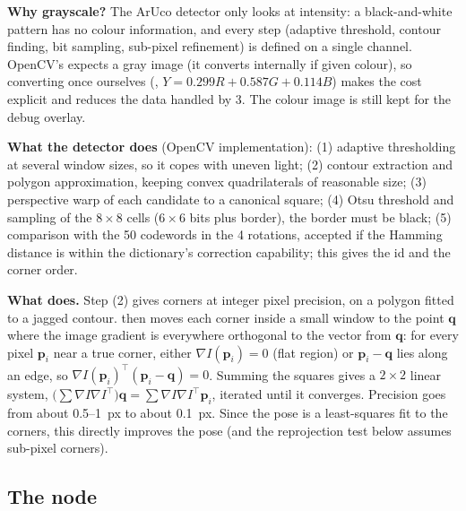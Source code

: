 \begin{keypoint}
\textbf{Why grayscale?} The ArUco detector only looks at intensity: a black-and-white pattern has no colour
information, and every step (adaptive threshold, contour finding, bit sampling, sub-pixel refinement) is defined on
a single channel. OpenCV's  expects a gray image (it converts internally if given colour), so
converting once ourselves (, $Y = 0.299R+0.587G+0.114B$) makes the cost
explicit and reduces the data handled by 3. The colour image is still kept for the debug overlay.

\textbf{What the detector does} (OpenCV implementation): (1) adaptive thresholding at several window sizes, so it
copes with uneven light; (2) contour extraction and polygon approximation, keeping convex quadrilaterals of
reasonable size; (3) perspective warp of each candidate to a canonical square; (4) Otsu threshold and sampling of the
$8\times8$ cells ($6\times6$ bits plus border), the border must be black; (5) comparison with the 50 codewords in the 4
rotations, accepted if the Hamming distance is within the dictionary's correction capability; this gives the id and
the corner order.

\textbf{What  does.} Step (2) gives corners at integer pixel precision, on a polygon fitted
to a jagged contour.  then moves each corner inside a small window to the point $\mathbf q$ where
the image gradient is everywhere orthogonal to the vector from $\mathbf q$: for every pixel $\mathbf p_i$ near a true
corner, either $\nabla I(\mathbf p_i)=0$ (flat region) or $\mathbf p_i-\mathbf q$ lies along an edge, so
$\nabla I(\mathbf p_i)^\top(\mathbf p_i-\mathbf q)=0$. Summing the squares gives a $2\times2$ linear system,
$\big(\sum \nabla I\nabla I^\top\big)\mathbf q = \sum \nabla I\nabla I^\top\mathbf p_i$, iterated until it converges.
Precision goes from about 0.5--1~px to about 0.1~px. Since the pose is a least-squares fit to the corners, this
directly improves the pose (and the reprojection test below assumes sub-pixel corners).
\end{keypoint}

\subsection{The node}

